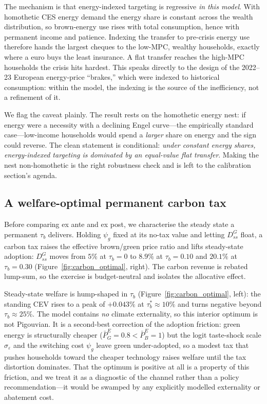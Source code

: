 \documentclass[11pt,a4paper]{article}
\begin{document}
The mechanism is that energy-indexed targeting is regressive \emph{in this
model}. With homothetic CES energy demand the energy share is constant across the
wealth distribution, so brown-energy use rises with total consumption, hence with
permanent income and patience. Indexing the transfer to pre-crisis energy use
therefore hands the largest cheques to the low-MPC, wealthy households, exactly
where a euro buys the least insurance. A flat transfer reaches the high-MPC
households the crisis hits hardest. This speaks directly to the design of the
2022--23 European energy-price ``brakes,'' which were indexed to historical
consumption: within the model, the indexing is the source of the inefficiency,
not a refinement of it.

We flag the caveat plainly. The result rests on the homothetic energy nest: if
energy were a necessity with a declining Engel curve---the empirically standard
case---low-income households would spend a \emph{larger} share on energy and the
sign could reverse. The clean statement is conditional: \emph{under constant
energy shares, energy-indexed targeting is dominated by an equal-value flat
transfer}. Making the nest non-homothetic is the right robustness check and is
left to the calibration section's agenda.

\subsection{A welfare-optimal permanent carbon tax}
\label{sec:carbontax}

Before comparing ex ante and ex post, we characterise the steady state a
permanent $\tau_b$ delivers. Holding $\psi_g$ fixed at its no-tax value and
letting $D^{G}_{ss}$ float, a carbon tax raises the effective brown/green price
ratio and lifts steady-state adoption: $D^{G}_{ss}$ moves from $5\%$ at
$\tau_b=0$ to $8.9\%$ at $\tau_b=0.10$ and $20.1\%$ at $\tau_b=0.30$
(Figure~\ref{fig:carbon_optimal}, right). The carbon revenue is rebated
lump-sum, so the exercise is budget-neutral and isolates the allocative effect.

Steady-state welfare is hump-shaped in $\tau_b$
(Figure~\ref{fig:carbon_optimal}, left): the standing CEV rises to a peak of
$+0.043\%$ at $\tau_b^{*}\approx 10\%$ and turns negative beyond
$\tau_b\approx 25\%$. The model contains \emph{no} climate externality, so this
interior optimum is not Pigouvian. It is a second-best correction of the
adoption friction: green energy is structurally cheaper
($\bar P^{E}_{G}=0.8<\bar P^{E}_{B}=1$) but the logit taste-shock scale
$\sigma_\varepsilon$ and the switching cost $\psi_g$ leave green under-adopted, so
a modest tax that pushes households toward the cheaper technology raises welfare
until the tax distortion dominates. That the optimum is positive at all is a
property of this friction, and we treat it as a diagnostic of the channel rather
than a policy recommendation---it would be swamped by any explicitly modelled
externality or abatement cost.
\end{document}
